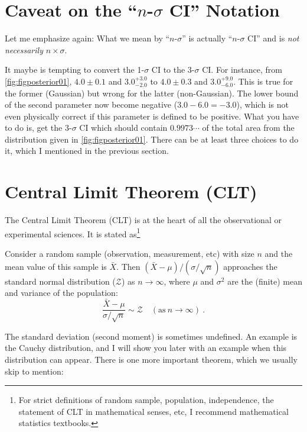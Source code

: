 \section{Caveat on the ``$ n $-$ \sigma $ CI'' Notation}
Let me emphasize again: What we mean by ``$ n $-$ \sigma $'' is actually ``$ n $-$ \sigma $ CI'' and is \textit{not necessarily} $ n \times \sigma $. 

It maybe is tempting to convert the 1-$ \sigma $ CI to the 3-$ \sigma $ CI. For instance, from \cref{fig:figposterior01}, $ 4.0 \pm 0.1 $ and $ 3.0^{+3.0}_{-2.0} $ to $ 4.0 \pm 0.3 $ and $ 3.0^{+9.0}_{-6.0} $. This is true for the former (Gaussian) but wrong for the latter (non-Gaussian). The lower bound of the second parameter now become negative ($ 3.0 - 6.0 = -3.0 $), which is not even physically correct if this parameter is defined to be positive. What you have to do is, get the 3-$ \sigma $ CI which should contain $ 0.9973\cdots $ of the total area from the distribution given in \cref{fig:figposterior01}. There can be at least three choices to do it, which I mentioned in the previous section.


\section{Central Limit Theorem (CLT)}
The Central Limit Theorem (CLT) is at the heart of all the observational or experimental sciences. It is stated as\footnote{For strict definitions of random sample, population, independence, the statement of CLT in mathematical senses, etc, I recommend mathematical statistics textbooks.}

\begin{thm} \label{thm: clt}
  Consider a random sample (observation, measurement, etc) with size $ n $ and the mean value of this sample is $ \bar{X} $. Then $ (\bar{X} - \mu) / (\sigma / \sqrt{n}) $ approaches the standard normal distribution ($ \mathcal{Z} $) as $ n \rightarrow \infty $, where $ \mu $ and $ \sigma^2 $ are the (finite) mean and variance of the population:
  \begin{equation}
    \frac{\bar{X} - \mu}{\sigma / \sqrt{n}} \sim \mathcal{Z}  \quad (\mathrm{as~} n \rightarrow \infty)~.
  \end{equation}
\end{thm}

The standard deviation (second moment) is sometimes undefined. An example is the Cauchy distribution, and I will show you later with an example when this distribution can appear. There is one more important theorem, which we usually skip to mention:

